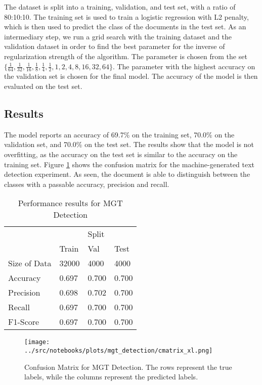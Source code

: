The dataset is split into a training, validation, and test set, with a ratio of 80:10:10. The training set is used to train a logistic regression with L2 penalty, which is then used to predict the class of the documents in the test set. As an intermediary step, we run a grid search with the training dataset and the validation dataset in order to find the best parameter for the inverse of regularization strength of the algorithm. The parameter is chosen from the set $\{\frac{1}{64}, \frac{1}{32}, \frac{1}{16}, \frac{1}{8}, \frac{1}{4}, \frac{1}{2}, 1, 2, 4, 8 , 16, 32 , 64\}$. The parameter with the highest accuracy on the validation set is chosen for the final model. The accuracy of the model is then evaluated on the test set. 

\subsection*{Results}
The model reports an accuracy of 69.7\% on the training set, 70.0\% on the validation set, and 70.0\% on the test set. The results show that the model is not overfitting, as the accuracy on the test set is similar to the accuracy on the training set. Figure \ref{fig:cmatrix_mgt_detection} shows the confusion matrix for the machine-generated text detection experiment. As seen, the document is able to distinguish between the classes with a passable accuracy, precision and recall. 


\begin{table}[htbp]
    \centering
    \caption{Performance results for MGT Detection}
    \label{tab:mgt_detection}
    \begin{tabular}{llll}
    \toprule
     & \multicolumn{3}{c}{Split} \\
     \cline{2-4}
     & Train & Val & Test \\
    \midrule 
    Size of Data & 32000 & 4000 & 4000 \\
    Accuracy & 0.697 & 0.700 & 0.700 \\
    Precision & 0.698 & 0.702 & 0.700 \\
    Recall & 0.697 & 0.700 & 0.700 \\
    F1-Score & 0.697 & 0.700 & 0.700 \\
    \bottomrule
    \end{tabular}
\end{table}

\begin{figure}[htbp]
    \centering
    \texttt{[image: ../src/notebooks/plots/mgt\_detection/cmatrix\_xl.png]} 
    \caption{Confusion Matrix for MGT Detection. The rows represent the true labels, while the columns represent the predicted labels.}
    \label{fig:cmatrix_mgt_detection}
\end{figure}

